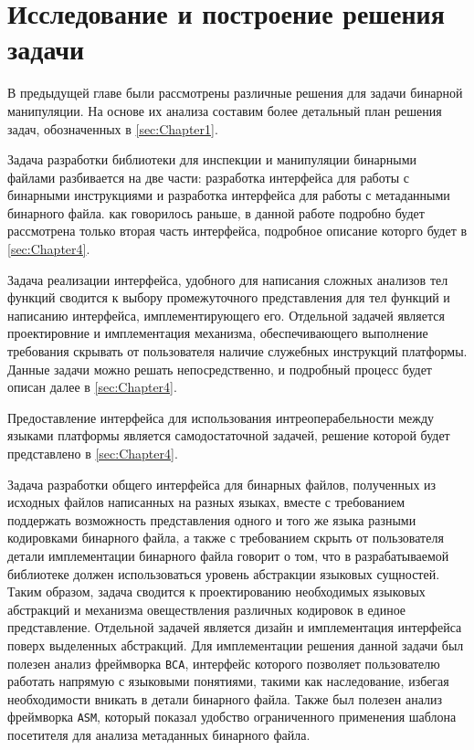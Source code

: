 \section{Исследование и построение решения задачи}
\label{sec:Chapter3} 

В предыдущей главе были рассмотрены различные решения для задачи бинарной манипуляции. На основе их анализа составим более детальный план решения задач, обозначенных в \autoref{sec:Chapter1}.

Задача разработки библиотеки для инспекции и манипуляции бинарными файлами разбивается на две части: разработка интерфейса для работы с бинарными инструкциями и разработка интерфейса для работы с метаданными бинарного файла. как говорилось раньше, в данной работе подробно будет рассмотрена только вторая часть интерфейса, подробное описание которго будет в \autoref{sec:Chapter4}.

Задача реализации интерфейса, удобного для написания сложных анализов тел функций сводится к выбору промежуточного представления для тел функций и написанию интерфейса, имплементирующего его. Отдельной задачей является проектировние и имплементация механизма, обеспечивающего выполнение требования скрывать от пользователя наличие служебных инструкций платформы. Данные задачи можно решать непосредственно, и подробный процесс будет описан далее в \autoref{sec:Chapter4}.

Предоставление интерфейса для использования интреоперабельности между языками платформы является самодостаточной задачей, решение которой будет представлено в \autoref{sec:Chapter4}.

Задача разработки общего интерфейса для бинарных файлов, полученных из исходных файлов написанных на разных языках, вместе с требованием поддержать возможность представления одного и того же языка разными кодировками бинарного файла, а также с требованием скрыть от пользователя детали имплементации бинарного файла говорит о том, что в разрабатываемой библиотеке должен использоваться уровень абстракции языковых сущностей. Таким образом, задача сводится к проектированию необходимых языковых абстракций и механизма овеществления различных кодировок в единое представление. Отдельной задачей является дизайн и имплементация интерфейса поверх выделенных абстракций. Для имплементации решения данной задачи был полезен анализ фреймворка \texttt{BCA}, интерфейс которого позволяет пользователю работать напрямую с языковыми понятиями, такими как наследование, избегая необходимости вникать в детали бинарного файла. Также был полезен анализ фреймворка \texttt{ASM}, который показал удобство ограниченного применения шаблона посетителя для анализа метаданных бинарного файла.

\newpage

